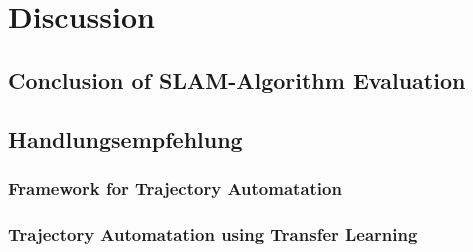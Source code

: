 \chapter{Discussion}

\section{Conclusion of SLAM-Algorithm Evaluation}


\section{Handlungsempfehlung}

\subsection{Framework for Trajectory Automatation}

\subsection{Trajectory Automatation using Transfer Learning}

